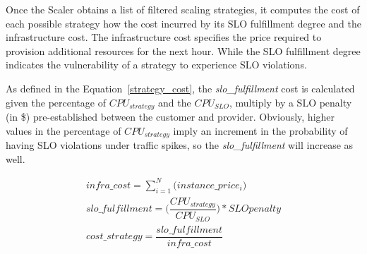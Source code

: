 

Once the Scaler obtains a list of filtered scaling strategies, it computes the cost of each possible strategy how the cost incurred by its SLO fulfillment degree and the infrastructure cost. The infrastructure cost specifies the price required to provision additional resources for the next hour. While the SLO fulfillment degree indicates the vulnerability of a strategy to experience SLO violations. 

As defined in the Equation~\ref{strategy_cost}, the \emph{slo\_fulfillment} cost is calculated given the percentage of \emph{$CPU_{strategy}$} and the \emph{$CPU_{SLO}$}, multiply by a SLO penalty (in \$)  pre-established between the customer and provider. Obviously, higher values in the percentage of \emph{$CPU_{strategy}$} imply an increment in the probability of having SLO violations under traffic spikes, so the \emph{slo\_fulfillment} will increase as well. 


{\scriptsize
\begin{equation}\label{strategy_cost}
\begin{split}
infra\_cost = \sum_{i=1}^N \big( instance\_price_{i} \big) \\
slo\_fulfillment =  \bigg( \dfrac{ CPU_{strategy} } {CPU_{SLO}} \bigg) * SLO penalty \\
cost\_strategy = \dfrac{  slo\_fulfillment  } {infra\_cost}
\end{split}
\end{equation}
}


